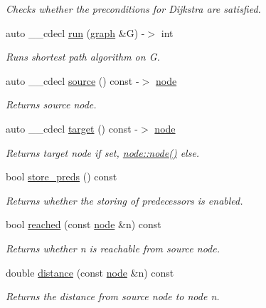 \begin{DoxyCompactItemize}
\begin{DoxyCompactList}\small\item\em Checks whether the preconditions for Dijkstra are satisfied. \end{DoxyCompactList}\item 
auto \+\_\+\+\_\+cdecl \mbox{\hyperlink{classdijkstra_a4a001133b2d94fd7cd2012ff18b5139b}{run}} (\mbox{\hyperlink{classgraph}{graph}} \&G) -\/$>$ int
\begin{DoxyCompactList}\small\item\em Runs shortest path algorithm on {\ttfamily G}. \end{DoxyCompactList}\item 
auto \+\_\+\+\_\+cdecl \mbox{\hyperlink{classdijkstra_a7a0b3d98168726348964fa238e247c71}{source}} () const -\/$>$ \mbox{\hyperlink{classnode}{node}}
\begin{DoxyCompactList}\small\item\em Returns source node. \end{DoxyCompactList}\item 
auto \+\_\+\+\_\+cdecl \mbox{\hyperlink{classdijkstra_a124934fec15045573a09df2da9e515ea}{target}} () const -\/$>$ \mbox{\hyperlink{classnode}{node}}
\begin{DoxyCompactList}\small\item\em Returns target node if set, {\ttfamily \mbox{\hyperlink{classnode_ad603259398d5667e3b97a6322a2bcc20}{node\+::node()}}} else. \end{DoxyCompactList}\item 
bool \mbox{\hyperlink{classdijkstra_a8ef3ee087994a56b774f48fd331725a3}{store\+\_\+preds}} () const
\begin{DoxyCompactList}\small\item\em Returns whether the storing of predecessors is enabled. \end{DoxyCompactList}\item 
bool \mbox{\hyperlink{classdijkstra_a405ff80abfc9ad98668534032eed6a5b}{reached}} (const \mbox{\hyperlink{classnode}{node}} \&n) const
\begin{DoxyCompactList}\small\item\em Returns whether {\ttfamily n} is reachable from source node. \end{DoxyCompactList}\item 
double \mbox{\hyperlink{classdijkstra_ae350a266dd47091d7f620a7328619426}{distance}} (const \mbox{\hyperlink{classnode}{node}} \&n) const
\begin{DoxyCompactList}\small\item\em Returns the distance from source node to node {\ttfamily n}. \end{DoxyCompactList}\item 

\end{DoxyCompactItemize}
